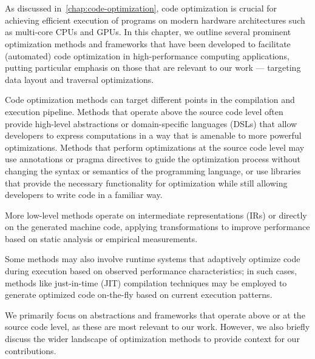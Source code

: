 \chapter{}\label{chap:optimization-methods}

As discussed in~\cref{chap:code-optimization}, code optimization is crucial for achieving efficient execution of programs on modern hardware architectures such as multi-core CPUs and GPUs.
In this chapter, we outline several prominent optimization methods and frameworks that have been developed to facilitate (automated) code optimization in high-performance computing applications, putting particular emphasis on those that are relevant to our work --- targeting data layout and traversal optimizations.

Code optimization methods can target different points in the compilation and execution pipeline.
Methods that operate above the source code level often provide high-level abstractions or domain-specific languages (DSLs) that allow developers to express computations in a way that is amenable to more powerful optimizations. Methods that perform optimizations at the source code level may use annotations or pragma directives to guide the optimization process without changing the syntax or semantics of the programming language, or use libraries that provide the necessary functionality for optimization while still allowing developers to write code in a familiar way.

More low-level methods operate on intermediate representations (IRs) or directly on the generated machine code, applying transformations to improve performance based on static analysis or empirical measurements.

Some methods may also involve runtime systems that adaptively optimize code during execution based on observed performance characteristics; in such cases, methods like just-in-time (JIT) compilation techniques may be employed to generate optimized code on-the-fly based on current execution patterns.

We primarily focus on abstractions and frameworks that operate above or at the source code level, as these are most relevant to our work. However, we also briefly discuss the wider landscape of optimization methods to provide context for our contributions.


